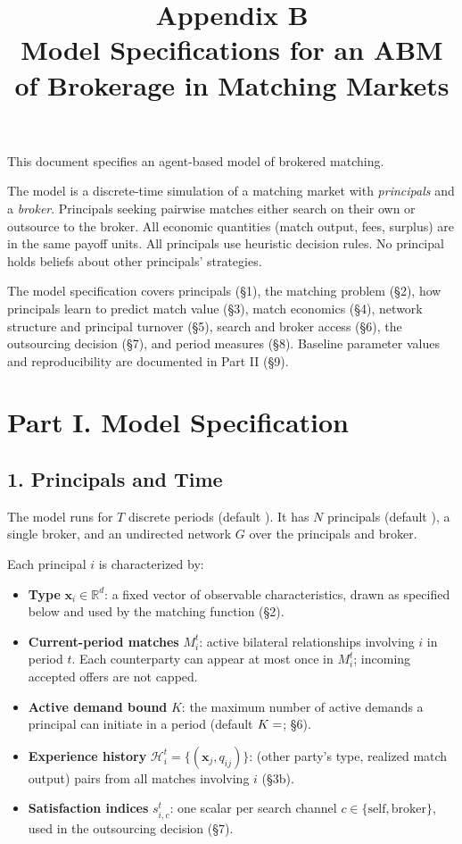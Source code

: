 \documentclass[11pt]{article}
\title{Appendix B\\Model Specifications for an ABM of Brokerage in Matching Markets}
\author{}
\date{}
\providecommand{\tightlist}{%
  \setlength{\itemsep}{0pt}\setlength{\parskip}{0pt}}
\begin{document}
\maketitle

This document specifies an agent-based model of brokered matching.

The model is a discrete-time simulation of a matching market with \emph{principals} and a \emph{broker}. Principals seeking pairwise matches either search on their own or outsource to the broker. All economic quantities (match output, fees, surplus) are in the same payoff units. All principals use heuristic decision rules. No principal holds beliefs about other principals' strategies.

The model specification covers principals (§1), the matching problem (§2), how principals learn to predict match value (§3), match economics (§4), network structure and principal turnover (§5), search and broker access (§6), the outsourcing decision (§7), and period measures (§8). Baseline parameter values and reproducibility are documented in Part II (§9).

\section{Part I. Model Specification}\label{part-i.-model-specification}

\subsection{1. Principals and Time}\label{agents-and-time}

The model runs for \(T\) discrete periods (default ). It has \(N\) principals (default ), a single broker, and an undirected network \(G\) over the principals and broker.

Each principal \(i\) is characterized by:

\begin{itemize}
\tightlist
\item \textbf{Type} \(\mathbf{x}_i \in \mathbb{R}^d\): a fixed vector of observable characteristics, drawn as specified below and used by the matching function (§2).
\item \textbf{Current-period matches} \(M_i^t\): active bilateral relationships involving \(i\) in period \(t\). Each counterparty can appear at most once in \(M_i^t\); incoming accepted offers are not capped.
\item \textbf{Active demand bound} \(K\): the maximum number of active demands a principal can initiate in a period (default \(K = \pv{settingK}\); §6).
\item \textbf{Experience history} \(\mathcal{H}_{i}^t = \{(\mathbf{x}_j, q_{ij})\}\): (other party's type, realized match output) pairs from all matches involving \(i\) (§3b).
\item \textbf{Satisfaction indices} \(s_{i,c}^t\): one scalar per search channel \(c \in \{\text{self}, \text{broker}\}\), used in the outsourcing decision (§7).
\end{itemize}
\end{document}
